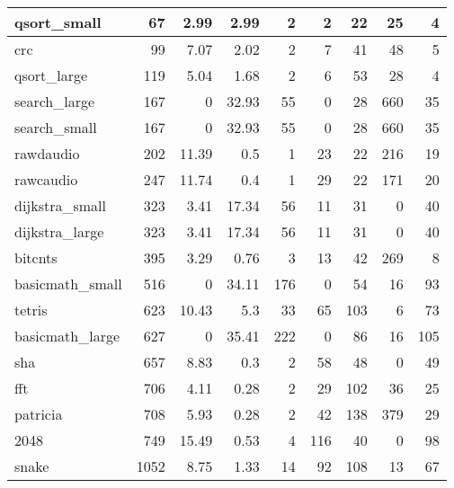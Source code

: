 \begin{tabular}{l|r|r|r|r|r|r|r|r}
\hline
 qsort\_small     &             67 &     2.99 &   2.99 &    2 &      2 &           22 &    25 &     4 \\
\hline
 crc             &             99 &     7.07 &   2.02 &    2 &      7 &           41 &    48 &     5 \\
\hline
 qsort\_large     &            119 &     5.04 &   1.68 &    2 &      6 &           53 &    28 &     4 \\
\hline
 search\_large    &            167 &     0    &  32.93 &   55 &      0 &           28 &   660 &    35 \\
\hline
 search\_small    &            167 &     0    &  32.93 &   55 &      0 &           28 &   660 &    35 \\
\hline
 rawdaudio       &            202 &    11.39 &   0.5  &    1 &     23 &           22 &   216 &    19 \\
\hline
 rawcaudio       &            247 &    11.74 &   0.4  &    1 &     29 &           22 &   171 &    20 \\
\hline
 dijkstra\_small  &            323 &     3.41 &  17.34 &   56 &     11 &           31 &     0 &    40 \\
\hline
 dijkstra\_large  &            323 &     3.41 &  17.34 &   56 &     11 &           31 &     0 &    40 \\
\hline
 bitcnts         &            395 &     3.29 &   0.76 &    3 &     13 &           42 &   269 &     8 \\
\hline
 basicmath\_small &            516 &     0    &  34.11 &  176 &      0 &           54 &    16 &    93 \\
\hline
 tetris          &            623 &    10.43 &   5.3  &   33 &     65 &          103 &     6 &    73 \\
\hline
 basicmath\_large &            627 &     0    &  35.41 &  222 &      0 &           86 &    16 &   105 \\
\hline
 sha             &            657 &     8.83 &   0.3  &    2 &     58 &           48 &     0 &    49 \\
\hline
 fft             &            706 &     4.11 &   0.28 &    2 &     29 &          102 &    36 &    25 \\
\hline
 patricia        &            708 &     5.93 &   0.28 &    2 &     42 &          138 &   379 &    29 \\
\hline
 2048            &            749 &    15.49 &   0.53 &    4 &    116 &           40 &     0 &    98 \\
\hline
 snake           &           1052 &     8.75 &   1.33 &   14 &     92 &          108 &    13 &    67 \\

\end{tabular}
